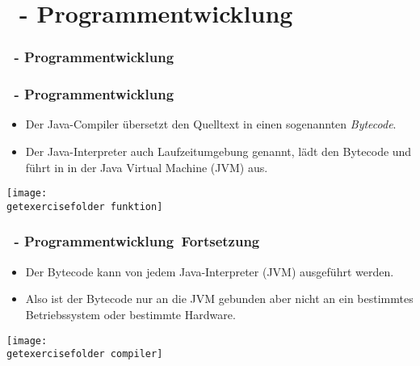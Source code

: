 \def\stitle{\theexercise\ - Programmentwicklung}
\section{\stitle}
\begin{frame}%
  \frametitle{\stitle}%
\tableofcontents[current]
\end{frame}


\begin{frame}%
  \frametitle{\stitle}%


\begin{itemize}
\item Der Java-Compiler übersetzt den Quelltext in einen sogenannten \emph{Bytecode}.
\item Der Java-Interpreter auch Laufzeitumgebung genannt, lädt den Bytecode und führt in in der Java Virtual Machine (JVM) aus.
\end{itemize}
\texttt{[image: \\getexercisefolder funktion]}

\end{frame}


\begin{frame}[t]%
  \frametitle{\stitle\ Fortsetzung}%


\begin{itemize}
\item Der Bytecode kann von jedem Java-Interpreter (JVM) ausgeführt werden.
\item Also ist der Bytecode nur an die JVM gebunden aber nicht an ein bestimmtes Betriebssystem oder bestimmte Hardware.
\end{itemize}
\texttt{[image: \\getexercisefolder compiler]}

\end{frame}